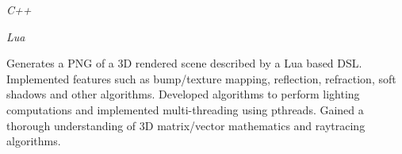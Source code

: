 \documentclass{article}
\newenvironment{name}{\fontfamily{phv}\selectfont\bfseries\normalsize}{\par}
\newenvironment{colorheading}{\fontfamily{phv}\selectfont\bfseries\normalsize\color{darkcyan}}{\par}
\newenvironment{genericbody}{\fontfamily{phv}\selectfont\small\raggedright}{\par}
\newenvironment{metadata}{\fontfamily{phv}\selectfont\itshape\small\color{darkgray}}{\par}
\newenvironment{experience}[2]%
{%
	\begin{minipage}{0.6\linewidth}\begin{flushleft}#1\end{flushleft}\end{minipage}%
	\hfill%
	\begin{minipage}{0.3\linewidth}\begin{flushright}#2\end{flushright}\end{minipage}%
}%
{}
\begin{document}
\begin{minipage}[t]{0.6\linewidth}
\begin{experience}
{		}
		{
      \begin{metadata}C++\end{metadata}
			\begin{metadata}Lua\end{metadata}
		}
    \end{experience}
    \begin{genericbody}
      Generates a PNG of a 3D rendered scene described by a Lua based DSL. Implemented features such as bump/texture
			mapping, reflection, refraction, soft shadows and other algorithms. Developed algorithms to perform lighting
			computations and implemented multi-threading using pthreads. Gained a thorough understanding of 3D matrix/vector
			mathematics and raytracing algorithms.
    \end{genericbody}
	\end{minipage}
\end{document}
